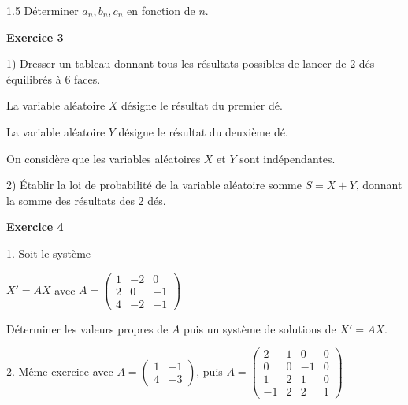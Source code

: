 \documentclass[12pt]{article}
\begin{document}
\begin{spacing}{1.5}
Déterminer $a_n,b_n,c_n$ en fonction de $n$.
 

\medskip\textbf{Exercice 3}
 
  1) Dresser un tableau donnant tous les résultats possibles de lancer de 2 dés équilibrés à 6 faces.
 
 La variable aléatoire $X$ désigne le résultat du premier dé.
 
 La variable aléatoire $Y$ désigne le résultat du deuxième dé.
 
 On considère que les variables aléatoires $X$ et $Y$ sont indépendantes.
 
 2) Établir la loi de probabilité de la variable aléatoire somme $S=X+Y$, donnant la somme des résultats des 2 dés.
 
 \medskip\textbf{Exercice 4}
 
 1. Soit le système 
 
 $X'=AX$ avec $A=\begin{pmatrix}
 1 & -2 & 0 \\ 
 2 & 0 & -1 \\ 
 4 & -2 & -1
 \end{pmatrix} $
 
 Déterminer les valeurs propres de $A$ puis un système de solutions de $X'=AX$.
 
 2. Même exercice avec
 $A=\begin{pmatrix}
 1 & -1 \\ 
 4 & -3
 \end{pmatrix} $, puis $A=\begin{pmatrix}
 2 & 1 & 0 & 0 \\ 
 0 & 0 & -1 & 0 \\ 
 1 & 2 & 1 & 0 \\ 
 -1 & 2 & 2 & 1
 \end{pmatrix} $
 
 
 \quad
 

\end{spacing}
\end{document}
